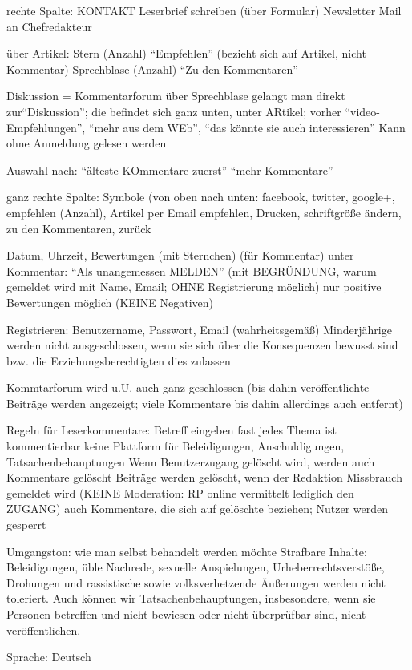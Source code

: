 rechte Spalte: KONTAKT
	Leserbrief schreiben (über Formular)
	Newsletter
	Mail an Chefredakteur 
	
über Artikel: 
	Stern (Anzahl) ``Empfehlen'' (bezieht sich auf Artikel, nicht Kommentar)
	Sprechblase (Anzahl) ``Zu den Kommentaren''
	
Diskussion = Kommentarforum
über Sprechblase gelangt man direkt zur``Diskussion''; die befindet sich ganz unten, unter ARtikel; vorher ``video-Empfehlungen'', ``mehr aus dem WEb'', ``das könnte sie auch interessieren''
Kann ohne Anmeldung gelesen werden

Auswahl nach:
	``älteste KOmmentare zuerst''
	``mehr Kommentare''


 ganz rechte Spalte:  Symbole (von oben nach unten: facebook, twitter, google+, empfehlen (Anzahl), Artikel per Email empfehlen, Drucken, schriftgröße ändern, zu den Kommentaren, zurück


Datum, Uhrzeit, Bewertungen (mit Sternchen) (für Kommentar)
unter Kommentar: ``Als unangemessen MELDEN'' (mit BEGRÜNDUNG, warum gemeldet wird mit Name, Email; OHNE Registrierung möglich)
nur positive Bewertungen möglich (KEINE Negativen)

Registrieren:
Benutzername, Passwort, Email (wahrheitsgemäß)
Minderjährige werden nicht ausgeschlossen, wenn sie sich über die Konsequenzen bewusst sind bzw. die Erziehungsberechtigten dies zulassen

Kommtarforum wird u.U. auch ganz geschlossen (bis dahin veröffentlichte Beiträge werden angezeigt; viele Kommentare bis dahin allerdings auch entfernt)


Regeln für Leserkommentare:
Betreff eingeben 
fast jedes Thema ist kommentierbar
keine Plattform für Beleidigungen, Anschuldigungen, Tatsachenbehauptungen
Wenn Benutzerzugang gelöscht wird, werden auch Kommentare gelöscht
Beiträge werden gelöscht, wenn der Redaktion Missbrauch gemeldet wird (KEINE Moderation: RP online vermittelt lediglich den ZUGANG) auch Kommentare, die sich auf gelöschte beziehen; Nutzer werden gesperrt

Umgangston: wie man selbst behandelt werden möchte
Strafbare Inhalte: Beleidigungen, üble Nachrede, sexuelle Anspielungen, Urheberrechtsverstöße, Drohungen und rassistische sowie volksverhetzende Äußerungen werden nicht toleriert. Auch können wir Tatsachenbehauptungen, insbesondere, wenn sie Personen betreffen und nicht bewiesen oder nicht überprüfbar sind, nicht veröffentlichen.
 
 Sprache: Deutsch
 
